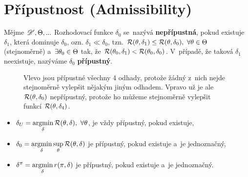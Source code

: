 \section{Přípustnost (Admissibility)}
\begin{define}
	Mějme $\mathscr{D}' ,\Theta,...$ Rozhodovací funkce $\delta_0$ se~nazývá \textbf{nepřípustná}, pokud existuje $\delta_1$, která dominuje $\delta_0$, ozn. $\delta_1\ll\delta_0$, tzn. $\mathcal{R}(\theta,\delta_1)\leq\mathcal{R}(\theta,\delta_0),~\forall\theta\in\Theta$ (stejnoměrně) a~$\exists\theta_0\in\Theta$ tak, že $\mathcal{R}(\theta_0,\delta_1)<\mathcal{R}(\theta_0,\delta_0)$. V~případě, že taková $\delta_1$ neexistuje, nazýváme $\delta_0$ \textbf{přípustný}.
	
	\begin{figure}[h]
		\centering
		\caption{Vlevo jsou přípustné všechny 4 odhady, protože žádný z~nich nejde stejnoměrně vylepšit nějakým jiným odhadem. Vpravo už je ale $\mathcal{R}(\theta,\delta_0)$ nepřípustný, protože ho můžeme stejnoměrně vylepšit funkcí $\mathcal{R}(\theta,\delta_4)$.}
		\label{fig:92}
	\end{figure}
	
\end{define}
\begin{theorem}\label{veta_pripustna}
	\begin{itemize}
		\item  $\delta_U=\mathop{\mathrm{argmin}}\limits_\delta\mathcal{R}(\theta,\delta),~\forall\theta$, je vždy přípustný, pokud existuje, \item  $\delta_0=\mathop{\mathrm{argmin}}\limits_\delta\sup\limits_\theta\mathcal{R}(\theta,\delta)$ je přípustný, pokud existuje a~je jednoznačný, \item  $\delta^\pi=\mathop{\mathrm{argmin}}\limits_\delta r(\pi,\delta)$ je přípustný, pokud existuje a~je jednoznačný.
	\end{itemize}
\end{theorem}

